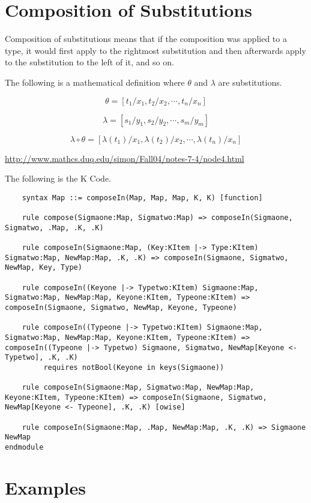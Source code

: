 \section{Composition of Substitutions}

Composition of substitutions means that if the composition was applied to a type, it would first apply to the rightmost substitution and then afterwards apply to the substitution to the left of it, and so on.

The following is a mathematical definition where $\theta$ and $\lambda$ are substitutions.

$$ \theta = [t_1 / x_1 , t_2 / x_2 , \cdots , t_n / x_n] $$

$$ \lambda = [s_1 / y_1 , s_2 / y_2 , \cdots , s_m / y_m] $$

$$ \lambda \circ \theta = [ \lambda(t_1) /x_1 , \lambda(t_2) / x_2, \cdots, \lambda(t_n) / x_n]$$

\url{http://www.mathcs.duq.edu/simon/Fall04/notes-7-4/node4.html}

The following is the K Code.

\begin{lstlisting}
    syntax Map ::= composeIn(Map, Map, Map, K, K) [function]

    rule compose(Sigmaone:Map, Sigmatwo:Map) => composeIn(Sigmaone, Sigmatwo, .Map, .K, .K)

    rule composeIn(Sigmaone:Map, (Key:KItem |-> Type:KItem) Sigmatwo:Map, NewMap:Map, .K, .K) => composeIn(Sigmaone, Sigmatwo, NewMap, Key, Type)

    rule composeIn((Keyone |-> Typetwo:KItem) Sigmaone:Map, Sigmatwo:Map, NewMap:Map, Keyone:KItem, Typeone:KItem) => composeIn(Sigmaone, Sigmatwo, NewMap, Keyone, Typeone)

    rule composeIn((Typeone |-> Typetwo:KItem) Sigmaone:Map, Sigmatwo:Map, NewMap:Map, Keyone:KItem, Typeone:KItem) => composeIn((Typeone |-> Typetwo) Sigmaone, Sigmatwo, NewMap[Keyone <- Typetwo], .K, .K)
         requires notBool(Keyone in keys(Sigmaone))

    rule composeIn(Sigmaone:Map, Sigmatwo:Map, NewMap:Map, Keyone:KItem, Typeone:KItem) => composeIn(Sigmaone, Sigmatwo, NewMap[Keyone <- Typeone], .K, .K) [owise]

    rule composeIn(Sigmaone:Map, .Map, NewMap:Map, .K, .K) => Sigmaone NewMap
endmodule
\end{lstlisting}

\section{Examples}